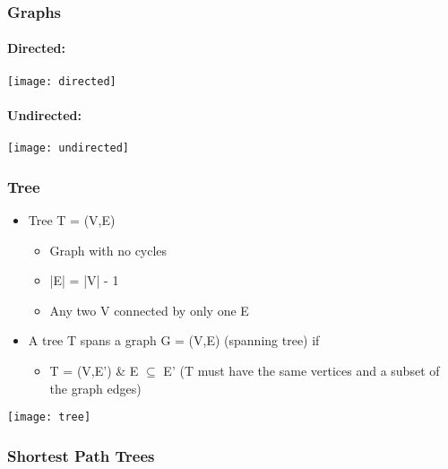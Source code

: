 \documentclass[../resumosRCOM.tex]{subfiles}
\begin{document}
 

\subsubsection{Graphs}

\paragraph{Directed:}

\begin{center}
    \texttt{[image: directed]}
\end{center}

\paragraph{Undirected:}

\begin{center}
    \texttt{[image: undirected]}
\end{center}

\subsubsection{Tree}

\begin{itemize}
    \item Tree T = (V,E)
    \begin{itemize}
        \item Graph with no cycles
        \item |E| = |V| - 1
        \item Any two V connected by only one E
    \end{itemize}
    \item A tree T spans a graph G = (V,E) (spanning tree) if
    \begin{itemize}
        \item T = (V,E') \& E $\subseteq$ E' (T must have the same vertices and a subset of the graph edges)
    \end{itemize}
\end{itemize}

\begin{center}
    \texttt{[image: tree]}
\end{center}

\subsubsection{Shortest Path Trees}
\end{document}
